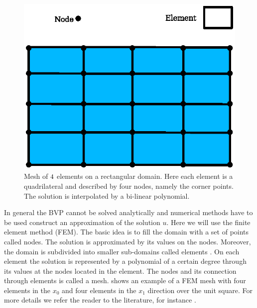 \begin{figure}
\centerline{\includegraphics[width=\figwidth]{figures/FirstStepMesh.eps}}
\caption{Mesh of $4 \time 4$ elements on a rectangular domain.  Here
each element is a quadrilateral and described by four nodes, namely
the corner points. The solution is interpolated by a bi-linear
polynomial.}
\label{fig:FirstSteps.2}
\end{figure}

In general the BVP cannot be solved analytically and numerical
methods have to be used construct an approximation of the solution
$u$. Here we will use the finite element method (FEM). The basic idea is to fill the domain with a
set of points called nodes. The solution is approximated by its
values on the nodes. Moreover, the domain is subdivided into smaller
sub-domains called elements . On each element the solution is
represented by a polynomial of a certain degree through its values at
the nodes located in the element. The nodes and its connection through
elements is called a mesh.  shows an
example of a FEM mesh with four elements in the $x_0$ and four elements
in the $x_1$ direction over the unit square.  
For more details we refer the reader to the literature, for instance
.

